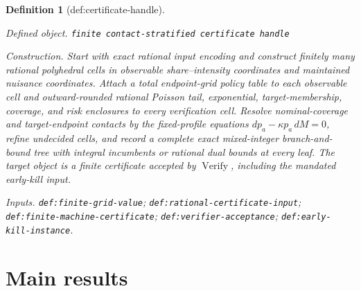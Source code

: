 \documentclass{article}
\newtheorem{definition}{Definition}
\begin{document}
\begin{definition}[def:certificate-handle]\label{def:certificate-handle}
\par\smallskip\noindent\emph{Defined object.} \texttt{finite contact-\allowbreak{}stratified certificate handle}
\par\smallskip\noindent\emph{Construction.} Start with exact rational input encoding and construct finitely many rational polyhedral cells in observable share--intensity coordinates and maintained nuisance coordinates. Attach a total endpoint-grid policy table to each observable cell and outward-rounded rational Poisson tail, exponential, target-membership, coverage, and risk enclosures to every verification cell. Resolve nominal-coverage and target-endpoint contacts by the fixed-profile equations \(dp_a-\kappa p_a\,dM=0\), refine undecided cells, and record a complete exact mixed-integer branch-and-bound tree with integral incumbents or rational dual bounds at every leaf. The target object is a finite certificate accepted by \(\operatorname{Verify}\), including the mandated early-kill input.
\par\smallskip\noindent\emph{Inputs.} \texttt{def:\allowbreak{}finite-\allowbreak{}grid-\allowbreak{}value}; \texttt{def:\allowbreak{}rational-\allowbreak{}certificate-\allowbreak{}input}; \texttt{def:\allowbreak{}finite-\allowbreak{}machine-\allowbreak{}certificate}; \texttt{def:\allowbreak{}verifier-\allowbreak{}acceptance}; \texttt{def:\allowbreak{}early-\allowbreak{}kill-\allowbreak{}instance}.
\end{definition}

\section{Main results}
\end{document}
